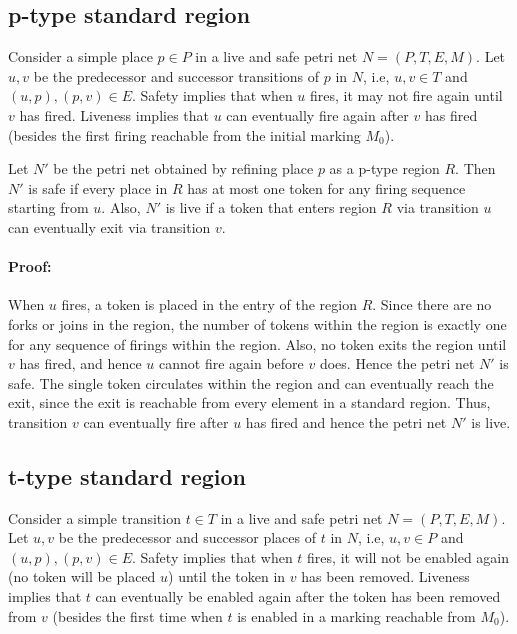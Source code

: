 \documentclass[12pt,a4paper]{article}
\begin{document}
\subsection{p-type standard region}
\label{sec:refinement-place}

Consider a simple place $p \in P$ in a live and safe petri net $N =
(P,T,E,M)$. Let $u,v$ be the predecessor and successor transitions of
$p$ in $N$, i.e, $u,v \in T$ and $(u,p), (p,v)\in E$. Safety implies
that when $u$ fires, it may not fire again until $v$ has fired.
Liveness implies that $u$ can eventually fire again after $v$ has
fired (besides the first firing reachable from the initial marking
$M_0$).

Let $N'$ be the petri net obtained by refining place $p$ as a p-type
region $R$. Then $N'$ is safe if every place in $R$ has at most one
token for any firing sequence starting from $u$. Also, $N'$ is live if
a token that enters region $R$ via transition $u$ can eventually exit
via transition $v$.

\paragraph{Proof:} When $u$ fires, a token is placed in the entry of
the region $R$. Since there are no forks or joins in the region, the
number of tokens within the region is exactly one for any sequence of
firings within the region. Also, no token exits the region until $v$
has fired, and hence $u$ cannot fire again before $v$ does. Hence the
petri net $N'$ is safe. The single token circulates within the region
and can eventually reach the exit, since the exit is reachable from
every element in a standard region. Thus, transition $v$ can
eventually fire after $u$ has fired and hence the petri net $N'$ is
live.

\subsection{t-type standard region}
\label{sec:refinement-transition}

Consider a simple transition $t \in T$ in a live and safe petri net $N
= (P,T,E,M)$. Let $u,v$ be the predecessor and successor places of $t$
in $N$, i.e, $u,v \in P$ and $(u,p), (p,v)\in E$. Safety implies that
when $t$ fires, it will not be enabled again (no token will be placed
$u$) until the token in $v$ has been removed. Liveness implies that
$t$ can eventually be enabled again after the token has been removed
from $v$ (besides the first time when $t$ is enabled in a marking
reachable from $M_0$).
\end{document}
